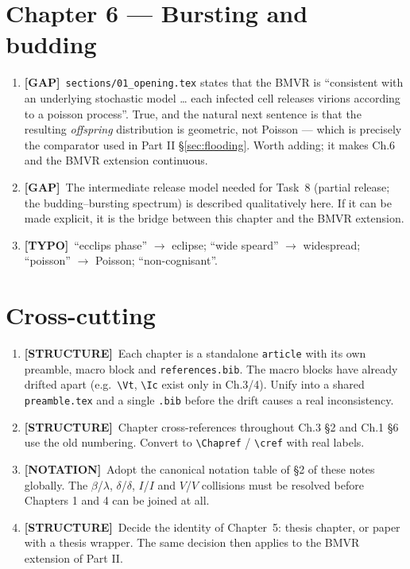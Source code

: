 \documentclass[11pt]{article}
\theoremstyle{plain}
\theoremstyle{definition}
\theoremstyle{remark}
\newcommand{\GAP}{\textcolor{orange!80!black}{\textbf{[GAP]}}}
\newcommand{\NOT}{\textcolor{blue!60!black}{\textbf{[NOTATION]}}}
\newcommand{\TYP}{\textcolor{gray!80!black}{\textbf{[TYPO]}}}
\newcommand{\STR}{\textcolor{purple!70!black}{\textbf{[STRUCTURE]}}}
\begin{document}
\section{Chapter 6 --- Bursting and budding}

\begin{enumerate}[leftmargin=2.2em,label=\textbf{6.\arabic*}]
\item \GAP\ \texttt{sections/01\_opening.tex} states that the BMVR is ``consistent with an
underlying stochastic model \dots{} each infected cell releases virions according to a
poisson process''. True, and the natural next sentence is that the resulting
\emph{offspring} distribution is geometric, not Poisson --- which is precisely the
comparator used in Part II \S\ref{sec:flooding}. Worth adding; it makes Ch.6 and the BMVR
extension continuous.

\item \GAP\ The intermediate release model needed for Task~8 (partial release; the
budding--bursting spectrum) is described qualitatively here. If it can be made explicit,
it is the bridge between this chapter and the BMVR extension.

\item \TYP\ ``ecclips phase'' $\to$ eclipse; ``wide speard'' $\to$ widespread;
``poisson'' $\to$ Poisson; ``non-cognisant''.
\end{enumerate}

\section{Cross-cutting}

\begin{enumerate}[leftmargin=2.2em,label=\textbf{X.\arabic*}]
\item \STR\ Each chapter is a standalone \texttt{article} with its own preamble, macro
block and \texttt{references.bib}. The macro blocks have already drifted apart
(e.g.\ \verb|\Vt|, \verb|\Ic| exist only in Ch.3/4). Unify into a shared
\texttt{preamble.tex} and a single \texttt{.bib} before the drift causes a real
inconsistency.

\item \STR\ Chapter cross-references throughout Ch.3 \S2 and Ch.1 \S6 use the old
numbering. Convert to \verb|\Chapref| / \verb|\cref| with real labels.

\item \NOT\ Adopt the canonical notation table of \S2 of these notes globally. The
$\beta$/$\lambda$, $\delta$/$\delta$, $I$/$I$ and $V$/$V$ collisions must be resolved
before Chapters 1 and 4 can be joined at all.

\item \STR\ Decide the identity of Chapter~5: thesis chapter, or paper with a thesis
wrapper. The same decision then applies to the BMVR extension of Part II.
\end{enumerate}
\end{document}

